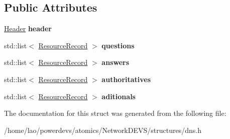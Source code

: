 \subsection*{Public Attributes}
\begin{DoxyCompactItemize}
\item 
\hyperlink{structdns_1_1Header}{Header} {\bfseries header}\hypertarget{structdns_1_1Packet_ace5e0371bc023efa2b4cd9ba82489052}{}\label{structdns_1_1Packet_ace5e0371bc023efa2b4cd9ba82489052}

\item 
std\+::list$<$ \hyperlink{structdns_1_1ResourceRecord}{Resource\+Record} $>$ {\bfseries questions}\hypertarget{structdns_1_1Packet_a5631816949452064bfef6add1307a84a}{}\label{structdns_1_1Packet_a5631816949452064bfef6add1307a84a}

\item 
std\+::list$<$ \hyperlink{structdns_1_1ResourceRecord}{Resource\+Record} $>$ {\bfseries answers}\hypertarget{structdns_1_1Packet_aacd3022640b60706f6be45c497a5ca15}{}\label{structdns_1_1Packet_aacd3022640b60706f6be45c497a5ca15}

\item 
std\+::list$<$ \hyperlink{structdns_1_1ResourceRecord}{Resource\+Record} $>$ {\bfseries authoritatives}\hypertarget{structdns_1_1Packet_a07495fe7b4c452b136da01b155c2f608}{}\label{structdns_1_1Packet_a07495fe7b4c452b136da01b155c2f608}

\item 
std\+::list$<$ \hyperlink{structdns_1_1ResourceRecord}{Resource\+Record} $>$ {\bfseries aditionals}\hypertarget{structdns_1_1Packet_aafa573148fd6ea9451c6f7db16676f25}{}\label{structdns_1_1Packet_aafa573148fd6ea9451c6f7db16676f25}

\end{DoxyCompactItemize}


The documentation for this struct was generated from the following file\+:\begin{DoxyCompactItemize}
\item 
/home/lao/powerdevs/atomics/\+Network\+D\+E\+V\+S/structures/dns.\+h\end{DoxyCompactItemize}
